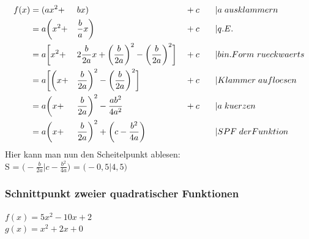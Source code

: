 \documentclass[a4paper]{article} %
\begin{document}
		\begin{alignat*}{4} 
		 f(x) 						&=  (ax^{2}    	     + && bx) 										 	   							  &&+c     && \hspace{0.3 cm}|a \hspace{0.1 cm} ausklammern \\ 
									&= a\bigg( x^{2} 	     + && \frac{b}{a}x \bigg) 						 		   	   							  && +c    && \hspace{0.3 cm}|q.E. \\
									&=  a \bigg[ x^{2}   + && 2\frac{b}{2a}x + \bigg(\frac{b}{2a}\bigg)^2 - \bigg(\frac{b}{2a}\bigg)^2 \bigg]&& +c    && \hspace{0.3 cm}|bin. Form\hspace{0.12 cm} rueckwaerts\\
									&=  a \bigg[\bigg( x + && \frac{b}{2a} \bigg)^{2}  - \bigg(\frac{b}{2a}\bigg)^2 \bigg]				  && +c    && \hspace{0.3 cm}|Klammer\hspace{0.1 cm} aufloesen\\
									&=  a \bigg( x       + && \frac{b}{2a} \bigg)^{2}  - \frac{ab^{2}}{4a^{2}} 							  && +c    && \hspace{0.3 cm}|a \hspace{0.1 cm} kuerzen \\ %
									&=  a \bigg( x       + && \frac{b}{2a} \bigg)^{2}  +\bigg( c - \frac{b^{2}}{4a}\bigg) 				  &&       && \hspace{0.3 cm} |SPF \hspace{0.1 cm} der Funktion \\
		\end{alignat*}
		\hspace{-0.1 cm}
		Hier kann man nun den Scheitelpunkt ablesen: \\
		
		S =   $\bigg( -\frac{b}{2a}  | c - \frac{b^{2}}{4a}\bigg)$ =  $\bigg( -0,5  | 4,5\bigg)$ 
		\subsubsection{Schnittpunkt zweier quadratischer Funktionen}
		$f(x)=5x^2-10x+2$\\
		$g(x)=x^2+2x+0$
		
\end{document}
